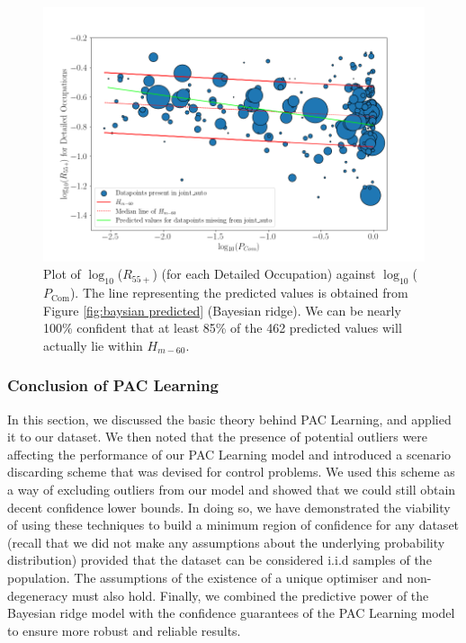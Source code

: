 \documentclass[11pt]{article}
\begin{document}
\begin{figure}[!htb]
	\centering
	\includegraphics[width=15cm]{Figures/Bayesian Ridge plus PAC.png}
	\caption{Plot of $\log_{10}$($R_{55+}$) (for each Detailed Occupation) against $\log_{10}$($P_{\text{Com}}$). The line representing the predicted values is obtained from Figure \ref{fig:baysian predicted} (Bayesian ridge). We can be nearly 100\% confident that at least 85\% of the 462 predicted values will actually lie within $H_{m-60}$.}
	\label{fig:bayesian plus PAC}
\end{figure}



\subsubsection*{Conclusion of PAC Learning}
In this section, we discussed the basic theory behind PAC Learning, and applied it to our dataset. We then noted that the presence of potential outliers were affecting the performance of our PAC Learning model and introduced a scenario discarding scheme that was devised for control problems. We used this scheme as a way of excluding outliers from our model and showed that we could still obtain decent confidence lower bounds. In doing so, we have demonstrated the viability of using these techniques to build a minimum region of confidence for any dataset (recall that we did not make any assumptions about the underlying probability distribution) provided that the dataset can be considered i.i.d samples of the population. The assumptions of the existence of a unique optimiser and non-degeneracy must also hold. Finally, we combined the predictive power of the Bayesian ridge model with the confidence guarantees of the PAC Learning model to ensure more robust and reliable results.
\end{document}
